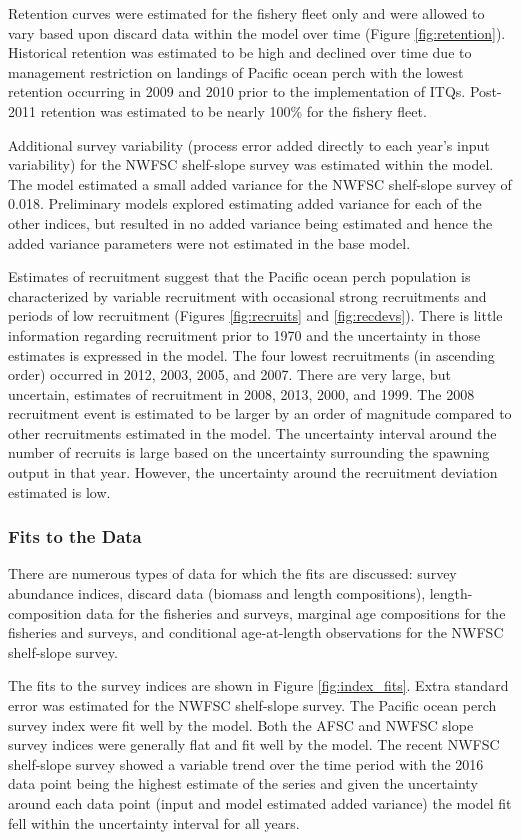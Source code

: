 \documentclass[12pt,]{article}
\begin{document}
Retention curves were estimated for the fishery fleet only and were
allowed to vary based upon discard data within the model over time
(Figure \ref{fig:retention}). Historical retention was estimated to be
high and declined over time due to management restriction on landings of
Pacific ocean perch with the lowest retention occurring in 2009 and 2010
prior to the implementation of ITQs. Post-2011 retention was estimated
to be nearly 100\% for the fishery fleet.

Additional survey variability (process error added directly to each
year's input variability) for the NWFSC shelf-slope survey was estimated
within the model. The model estimated a small added variance for the
NWFSC shelf-slope survey of 0.018. Preliminary models explored
estimating added variance for each of the other indices, but resulted in
no added variance being estimated and hence the added variance
parameters were not estimated in the base model.

Estimates of recruitment suggest that the Pacific ocean perch population
is characterized by variable recruitment with occasional strong
recruitments and periods of low recruitment (Figures \ref{fig:recruits}
and \ref{fig:recdevs}). There is little information regarding
recruitment prior to 1970 and the uncertainty in those estimates is
expressed in the model. The four lowest recruitments (in ascending
order) occurred in 2012, 2003, 2005, and 2007. There are very large, but
uncertain, estimates of recruitment in 2008, 2013, 2000, and 1999. The
2008 recruitment event is estimated to be larger by an order of
magnitude compared to other recruitments estimated in the model. The
uncertainty interval around the number of recruits is large based on the
uncertainty surrounding the spawning output in that year. However, the
uncertainty around the recruitment deviation estimated is low.

\subsubsection{Fits to the Data}\label{fits-to-the-data}

There are numerous types of data for which the fits are discussed:
survey abundance indices, discard data (biomass and length
compositions), length-composition data for the fisheries and surveys,
marginal age compositions for the fisheries and surveys, and conditional
age-at-length observations for the NWFSC shelf-slope survey.

The fits to the survey indices are shown in Figure \ref{fig:index_fits}.
Extra standard error was estimated for the NWFSC shelf-slope survey. The
Pacific ocean perch survey index were fit well by the model. Both the
AFSC and NWFSC slope survey indices were generally flat and fit well by
the model. The recent NWFSC shelf-slope survey showed a variable trend
over the time period with the 2016 data point being the highest estimate
of the series and given the uncertainty around each data point (input
and model estimated added variance) the model fit fell within the
uncertainty interval for all years.
\end{document}
